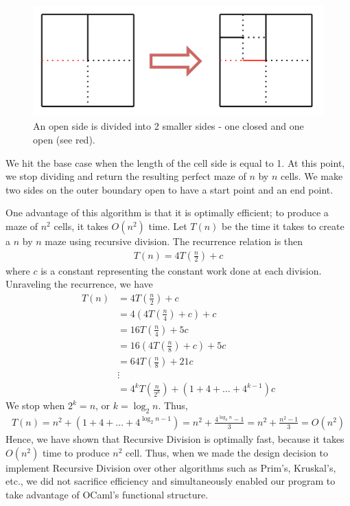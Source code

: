 \documentclass[11pt, margin=1in]{article}
\newcommand{\tab}{\par \qquad}
\begin{document}
\begin{figure}[H]
\begin{center}
\includegraphics[scale=0.7]{gen2.jpg}
\end{center}
\caption{An open side is divided into 2 smaller sides - one closed and one open (see red).}
\end{figure}

We hit the base case when the length of the cell side is equal to 1.  At this point, we stop dividing and return the resulting perfect maze of $n$ by $n$ cells.  We make two sides on the outer boundary open to have a start point and an end point.    

\tab One advantage of this algorithm is that it is optimally efficient; to produce a maze of $n^2$ cells, it takes $O(n^2)$ time.  Let $T(n)$ be the time it takes to create a $n$ by $n$ maze using recursive division.  The recurrence relation is then
\begin{align*}
T(n) = 4T\left(\frac{n}{2}\right) + c
\end{align*}  
where $c$ is a constant representing the constant work done at each division.  Unraveling the recurrence, we have
\begin{align*}
T(n) &= 4T\left(\frac{n}{2}\right) + c \\
&= 4\left(4T\left(\frac{n}{4}\right) + c\right) + c \\ 
&= 16 T\left(\frac{n}{4}\right) + 5c \\
&= 16 \left(4T\left(\frac{n}{8}\right) + c\right) + 5c \\ 
&= 64 T\left(\frac{n}{8}\right) + 21c \\
& \vdots \\
& = 4^k T\left(\frac{n}{2^k}\right) + (1 + 4 + \ldots + 4^{k-1})c
\end{align*}
We stop when $2^k = n$, or $k = \log_2n$.  Thus, 
\begin{align*}
T(n) = n^2 + (1 + 4 + \ldots + 4^{\log_2n-1}) = n^2 + \frac{4^{\log_2n} - 1}{3} = n^2 + \frac{n^2 - 1}{3} = O(n^2)
\end{align*}
Hence, we have shown that Recursive Division is optimally fast, because it takes $O(n^2)$ time to produce $n^2$ cell.  Thus, when we made the design decision to implement Recursive Division over other algorithms such as Prim's, Kruskal's, etc., we did not sacrifice efficiency and simultaneously enabled our program to take advantage of OCaml's functional structure.    
\end{document}
